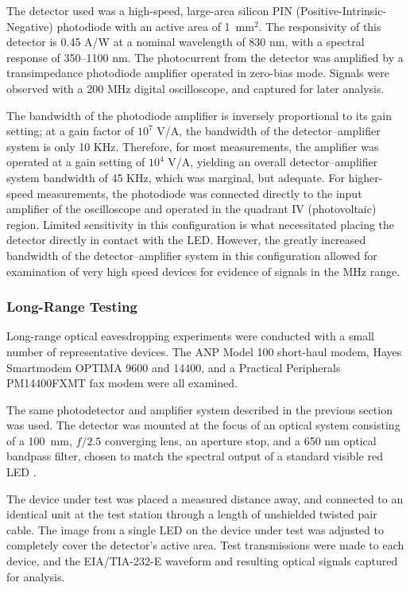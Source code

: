 \documentclass{acmtrans2e}
\begin{document}
The detector used was a high-speed, large-area silicon PIN
(Positive-Intrinsic-Negative) photodiode with an active area of
1~$\mathrm{mm}^2$.  
The responsivity of this detector is 0.45 A/W at a 
nominal wavelength of 830 nm, with a spectral response of 350--1100 nm.  
The photocurrent from the detector was amplified by a transimpedance 
photodiode amplifier operated in zero-bias mode.  Signals were 
observed with a 200 MHz digital oscilloscope, and captured for later
analysis.

The bandwidth of the 
photodiode amplifier is inversely proportional to its gain setting; at
a gain factor of $10^7$ V/A, the bandwidth of the
detector--amplifier system is only 10 KHz.  Therefore, for most
measurements, the 
amplifier was operated at a gain setting of $10^4$ V/A, yielding an 
overall detector--amplifier system bandwidth of 45 KHz, which was
marginal, but adequate.  For higher-speed 
measurements, the photodiode was connected directly to the input 
amplifier of the oscilloscope and operated in the quadrant IV 
(photovoltaic) region.  Limited sensitivity in this configuration 
is what necessitated placing the detector directly in contact with the 
LED.  However, the greatly increased bandwidth of the detector--amplifier 
system in this configuration allowed for examination of very high
speed devices for evidence of signals in the MHz range.

\subsubsection{Long-Range Testing}

Long-range optical eavesdropping experiments were conducted with a small 
number of representative devices.  The ANP Model 100 short-haul modem, 
Hayes Smartmodem OPTIMA 9600 and 14400, and a Practical Peripherals 
PM14400FXMT fax modem were all examined.

The same photodetector and amplifier system described in the previous 
section was used.  The detector was mounted at the 
focus of an optical system consisting of a 100~mm, $f/2.5$ 
converging lens, an aperture stop, and a 650 nm optical bandpass filter, 
chosen to match the spectral output of a standard visible red 
LED \cite{agilent_led_data_sheet}.

The device under test was placed a measured distance away, and connected 
to an identical unit at the test station through a length of unshielded 
twisted pair cable.  The image from a single LED on the 
device under test was adjusted to completely cover the detector's active 
area.  Test transmissions were made to each device, and the
EIA/TIA-232-E waveform and resulting optical signals captured for
analysis.
\end{document}
